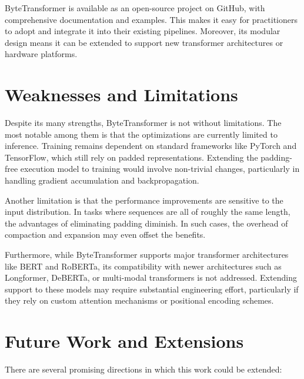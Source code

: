 \documentclass[11pt]{article}
\begin{document}
ByteTransformer is available as an open-source project on GitHub, with comprehensive documentation and examples. This makes it easy for practitioners to adopt and integrate it into their existing pipelines. Moreover, its modular design means it can be extended to support new transformer architectures or hardware platforms.

\section{Weaknesses and Limitations}

Despite its many strengths, ByteTransformer is not without limitations. The most notable among them is that the optimizations are currently limited to inference. Training remains dependent on standard frameworks like PyTorch and TensorFlow, which still rely on padded representations. Extending the padding-free execution model to training would involve non-trivial changes, particularly in handling gradient accumulation and backpropagation.

Another limitation is that the performance improvements are sensitive to the input distribution. In tasks where sequences are all of roughly the same length, the advantages of eliminating padding diminish. In such cases, the overhead of compaction and expansion may even offset the benefits.

Furthermore, while ByteTransformer supports major transformer architectures like BERT and RoBERTa, its compatibility with newer architectures such as Longformer, DeBERTa, or multi-modal transformers is not addressed. Extending support to these models may require substantial engineering effort, particularly if they rely on custom attention mechanisms or positional encoding schemes.

\section{Future Work and Extensions}

There are several promising directions in which this work could be extended:
\end{document}
